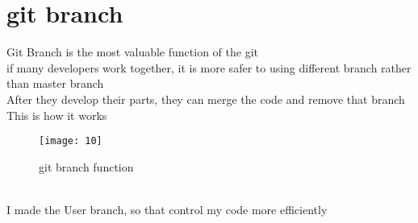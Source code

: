 \section{git branch}
Git Branch is the most valuable function of the git\\
if many developers work together, it is more safer to using different branch rather than master branch\\
After they develop their parts, they can merge the code and remove that branch\\
This is how it works\\ 
\begin{figure} [!h]
	\centering
	\texttt{[image: 10]}
	\caption{git branch function}
	\label{fig:10}
\end{figure}\\
I made the User branch, so that control my code more efficiently